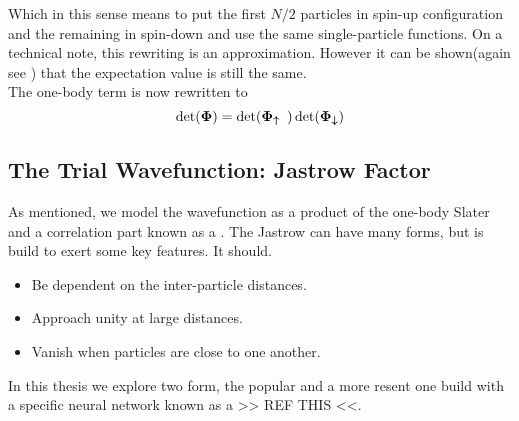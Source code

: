         Which in this sense means to put the first $N/2$ particles in spin-up
        configuration and the remaining in spin-down and use the same
        single-particle functions.  On a technical note, this rewriting is an
        approximation. However it can be shown(again see \cite{splitDet}) that
        the expectation value is still the same.\\
        The one-body term is now rewritten to
            \begin{equation}
                \det(\boldsymbol{{\Phi}}) = \det(\boldsymbol{{\Phi_{\uparrow}}})
                \det(\boldsymbol{{\Phi_{\downarrow}}})
            \end{equation}

    \subsection{The Trial Wavefunction: Jastrow Factor\label{susec:TWFJastrow}}
        As mentioned, we model the wavefunction as a product of the one-body
        Slater and a correlation part known as a . The
        Jastrow can have many forms, but is build to exert some key features.
        It should\cite{jastrow}. 
        \begin{itemize}
            \item Be dependent on the inter-particle distances.
            \item Approach unity at large distances.
            \item Vanish when particles are close to one another.
        \end{itemize}
        In this thesis we explore two form, the popular 
        and a more resent one build with a specific neural network known as a
         >> REF THIS <<.
    

